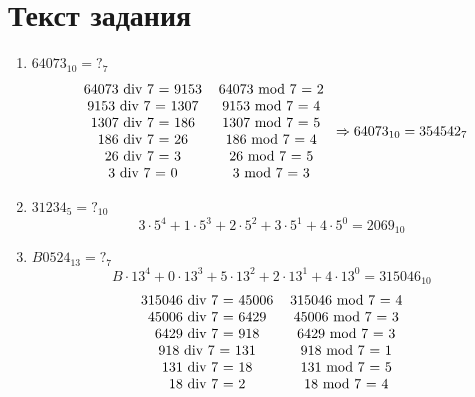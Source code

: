 \documentclass{article}
\begin{document}

\section*{Текст задания}

\begin{enumerate}
  \item $ 64073_{10}       = ?_{7}$
        $$ \begin{tabular}{cc}
            64073 div 7 = 9153 & 64073 mod 7 = 2 \\
            9153 div 7 = 1307  & 9153 mod 7 = 4  \\
            1307 div 7 = 186   & 1307 mod 7 = 5  \\
            186 div 7 = 26     & 186 mod 7 = 4   \\
            26 div 7 = 3       & 26 mod 7 = 5    \\
            3 div 7 = 0        & 3 mod 7 = 3     \\
          \end{tabular}
          \Rightarrow
          64073_{10} = 354542_{7}
        $$
  \item $ 31234_{5}        = ?_{10}$
        $$ 3\cdot5^4 + 1\cdot5^3 + 2\cdot5^2 + 3\cdot5^1 + 4\cdot5^0 =
          2069_{10}
        $$
  \item $ B0524_{13}       = ?_{7}$
        $$ B\cdot13^4 + 0\cdot13^3 + 5\cdot13^2 + 2\cdot13^1 + 4\cdot13^0 = 315046_{10}
        $$ $$
          \begin{tabular}{cc}
            315046 div 7 = 45006 & 315046 mod 7 = 4 \\
            45006 div 7 = 6429   & 45006 mod 7 = 3  \\
            6429 div 7 = 918     & 6429 mod 7 = 3   \\
            918 div 7 = 131      & 918 mod 7 = 1    \\
            131 div 7 = 18       & 131 mod 7 = 5    \\
            18 div 7 = 2         & 18 mod 7 = 4     \\

\end{tabular}$$
\end{enumerate}
\end{document}
